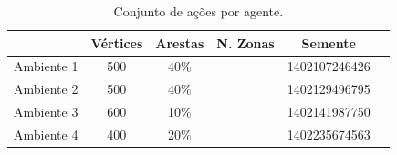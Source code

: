 \documentclass{llncs}
\begin{document}
\begin{table}[ht]
\centering
\begin{tabular}{|c|c|c|c|c|c|}
  \hline
             & Vértices & Arestas & N. Zonas &    Semente    \\ \hline
  Ambiente 1 &   500    &   40\%  &          & 1402107246426 \\ \hline
  Ambiente 2 &   500    &   40\%  &          & 1402129496795 \\ \hline
  Ambiente 3 &   600    &   10\%  &          & 1402141987750 \\ \hline
  Ambiente 4 &   400    &   20\%  &          & 1402235674563 \\ \hline
\end{tabular}
\caption{Conjunto de ações por agente.}
\label{table:ambientes}
\end{table}
\end{document}
